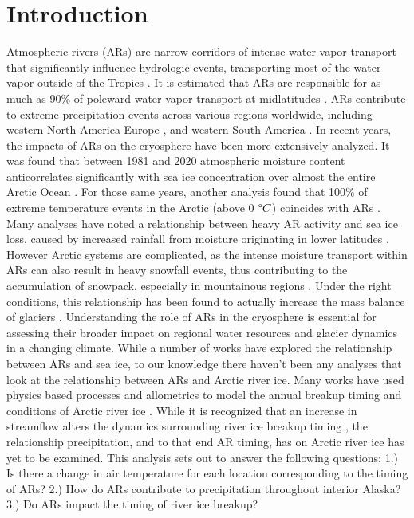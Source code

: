 \documentclass[draft]{AR_analysis_}
\begin{document}
\section{Introduction}

Atmospheric rivers (ARs) are narrow corridors of intense water vapor
transport that significantly influence hydrologic events, transporting
most of the water vapor outside of the Tropics \cite{NOAA_AR_summary}.
It is estimated that ARs are responsible for as much as 90\% of poleward
water vapor transport at midlatitudes \cite{other_alg}. ARs contribute to
extreme precipitation events across various regions worldwide, including
western North America \cite{Dettinger2004, Neiman2008, Guan2010,
ARs_flood_WA_State, ARs_flood_Russian_River_CA, Ralph2013, ARs_CA}
Europe \cite{Lavers2013, ARs_impact_Norway}, and western South America
\cite{ARs_impact_SA}. In recent years, the impacts of ARs on the
cryosphere have been more extensively analyzed. It was found that between
1981 and 2020 atmospheric moisture content anticorrelates significantly
with sea ice concentration over almost the entire Arctic Ocean
\cite{ARs_lead_to_sea_ice_loss}. For those same years, another analysis
found that 100\% of extreme temperature events in the Arctic (above 0
$\degree C$) coincides with ARs \cite{Ma2023}. Many analyses have noted
a relationship between heavy AR activity and sea ice loss, caused by
increased rainfall from moisture originating in lower latitudes
\cite{Zhang2023, maclennan_contribution_2022}. However Arctic systems
are complicated, as the intense moisture transport within ARs can also
result in heavy snowfall events, thus contributing to the accumulation
of snowpack, especially in mountainous regions \cite{Saavedra2020,
Guan2010}. Under the right conditions, this relationship has been found
to actually increase the mass balance of glaciers \cite{Little2019}.
Understanding the role of ARs in the cryosphere is essential for
assessing their broader impact on regional water resources and glacier
dynamics in a changing climate. While a number of works have explored
the relationship between ARs and sea ice, to our knowledge there haven't
been any analyses that look at the relationship between ARs and Arctic
river ice. Many works have used physics based processes and allometrics
to model the annual breakup timing and conditions of Arctic river ice
\cite{Paily, ashton1986river, Prowse_Bonsal_Duguay_Lacroix_2007,
jasek1998, shen_newest}. While it is recognized that an increase in
streamflow alters the dynamics surrounding river ice breakup timing
\cite{ashton1986river}, the relationship precipitation, and to that end
AR timing, has on Arctic river ice has yet to be examined. This analysis
sets out to answer the following questions: 1.) Is there a change in
air temperature for each location corresponding to the timing of ARs?
2.) How do ARs contribute to precipitation throughout interior Alaska?
3.) Do ARs impact the timing of river ice breakup?
\end{document}
